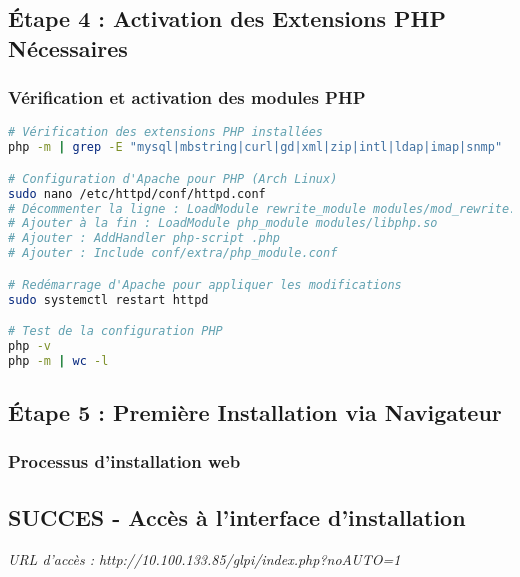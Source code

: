 \documentclass[12pt,a4paper]{article}
\newcommand{\successbox}[2]{\subsection{SUCCES - #1}\textit{#2}}
\begin{document}
\subsection{Étape 4 : Activation des Extensions PHP Nécessaires}

\subsubsection{Vérification et activation des modules PHP}
\begin{lstlisting}[language=bash, caption=Configuration des extensions PHP sur Arch]
# Vérification des extensions PHP installées
php -m | grep -E "mysql|mbstring|curl|gd|xml|zip|intl|ldap|imap|snmp"

# Configuration d'Apache pour PHP (Arch Linux)
sudo nano /etc/httpd/conf/httpd.conf
# Décommenter la ligne : LoadModule rewrite_module modules/mod_rewrite.so
# Ajouter à la fin : LoadModule php_module modules/libphp.so
# Ajouter : AddHandler php-script .php
# Ajouter : Include conf/extra/php_module.conf

# Redémarrage d'Apache pour appliquer les modifications
sudo systemctl restart httpd

# Test de la configuration PHP
php -v
php -m | wc -l
\end{lstlisting}

\subsection{Étape 5 : Première Installation via Navigateur}

\subsubsection{Processus d'installation web}
\successbox{Accès à l'interface d'installation}{
URL d'accès : http://10.100.133.85/glpi/index.php?noAUTO=1
}
\end{document}
